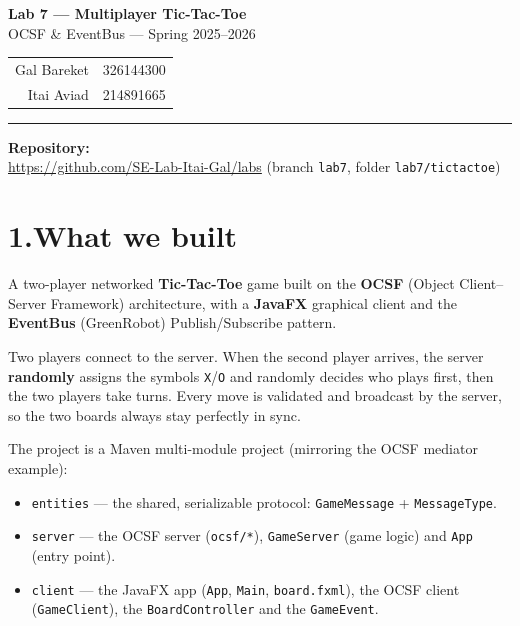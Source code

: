 \documentclass[11pt]{article}
\newcommand{\code}[1]{\texttt{\small #1}}
\begin{document}
\begin{center}
    {\LARGE\bfseries Lab 7 --- Multiplayer Tic-Tac-Toe}\\[2pt]
    {\large OCSF \& EventBus --- Spring 2025--2026}\\[10pt]
    \begin{tabular}{rl}
        Gal Bareket & 326144300\\
        Itai Aviad  & 214891665\\
    \end{tabular}
\end{center}

\hrule
\vspace{8pt}

\textbf{Repository:}\\
\url{https://github.com/SE-Lab-Itai-Gal/labs} \quad (branch \code{lab7}, folder \code{lab7/tictactoe})

\section*{1.\quad What we built}

A two-player networked \textbf{Tic-Tac-Toe} game built on the \textbf{OCSF}
(Object Client--Server Framework) architecture, with a \textbf{JavaFX} graphical
client and the \textbf{EventBus} (GreenRobot) Publish/Subscribe pattern.

Two players connect to the server. When the second player arrives, the server
\textbf{randomly} assigns the symbols \code{X}/\code{O} and randomly decides who
plays first, then the two players take turns. Every move is validated and
broadcast by the server, so the two boards always stay perfectly in sync.

The project is a Maven multi-module project (mirroring the OCSF mediator example):

\begin{itemize}[leftmargin=1.4em,itemsep=1pt]
    \item \code{entities} --- the shared, serializable protocol: \code{GameMessage} + \code{MessageType}.
    \item \code{server} --- the OCSF server (\code{ocsf/*}), \code{GameServer} (game logic) and \code{App} (entry point).
    \item \code{client} --- the JavaFX app (\code{App}, \code{Main}, \code{board.fxml}), the OCSF client
          (\code{GameClient}), the \code{BoardController} and the \code{GameEvent}.
\end{itemize}
\end{document}
